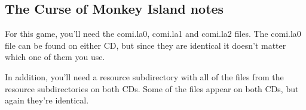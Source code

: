 \subsection{The Curse of Monkey Island notes}

For this game, you'll need the comi.la0, comi.la1 and comi.la2 files. The
comi.la0 file can be found on either CD, but since they are identical it
doesn't matter which one of them you use.

In addition, you'll need a resource subdirectory with all of the files from the
resource subdirectories on both CDs. Some of the files appear on both CDs, but
again they're identical.


